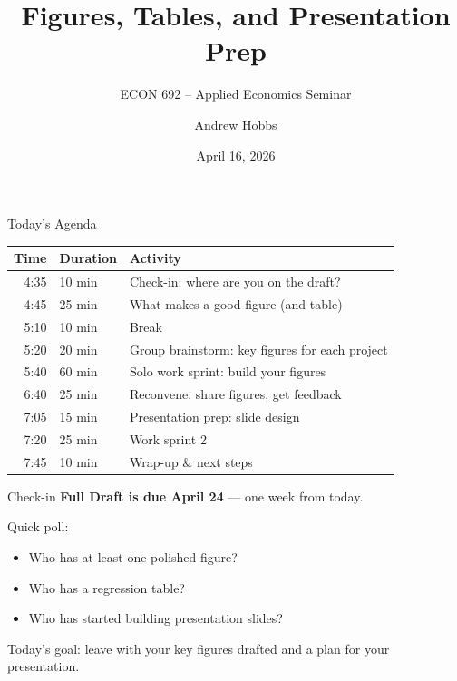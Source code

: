

\title{Figures, Tables, and Presentation Prep}
\subtitle{ECON 692 -- Applied Economics Seminar}
\author{Andrew Hobbs}
\date{April 16, 2026}



\begin{frame}[plain]
  \titlepage
\end{frame}


\begin{frame}{Today's Agenda}
  \small
  \begin{tabular}{@{}r@{\hspace{8pt}}l@{\hspace{16pt}}l@{}}
    \toprule
    \textbf{Time} & \textbf{Duration} & \textbf{Activity} \\
    \midrule
    4:35 & 10 min & Check-in: where are you on the draft? \\
    4:45 & 25 min & What makes a good figure (and table) \\
    5:10 & 10 min & Break \\
    5:20 & 20 min & Group brainstorm: key figures for each project \\
    5:40 & 60 min & Solo work sprint: build your figures \\
    6:40 & 25 min & Reconvene: share figures, get feedback \\
    7:05 & 15 min & Presentation prep: slide design \\
    7:20 & 25 min & Work sprint 2 \\
    7:45 & 10 min & Wrap-up \& next steps \\
    \bottomrule
  \end{tabular}
\end{frame}

\begin{frame}{Check-in}
  \textbf{\textcolor{usfgreen}{Full Draft is due April 24}} --- one week from today.

  \vspace{8pt}

  Quick poll:

  \vspace{4pt}

  \begin{itemize}
    \item Who has at least one polished figure?
    \item Who has a regression table?
    \item Who has started building presentation slides?
  \end{itemize}

  \vspace{8pt}

  Today's goal: leave with your key figures drafted and a plan for your presentation.
\end{frame}


